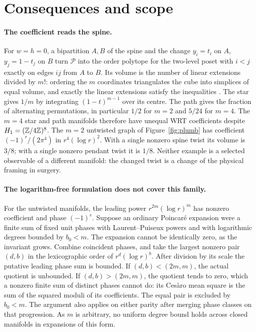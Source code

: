 \section{Consequences and scope}


\paragraph{The coefficient reads the spine.}
For \(w=h=0\), a bipartition \(A,B\) of the spine and the change \(y_i=t_i\) on \(A\), \(y_j=1-t_j\) on \(B\) turn \(\mathcal P\) into the order polytope for the two-level poset with \(i<j\) exactly on edges \(ij\) from \(A\) to \(B\). Its volume is the number of linear extensions divided by \(m!\): ordering the \(m\) coordinates triangulates the cube into simplices of equal volume, and exactly the linear extensions satisfy the inequalities \cite{Stanley}. The star gives \(1/m\) by integrating \((1-t)^{m-1}\) over its centre. The path gives the fraction of alternating permutations, in particular \(1/2\) for \(m=2\) and \(5/24\) for \(m=4\). The \(m=4\) star and path manifolds therefore have unequal WRT coefficients despite \(H_1=(\mathbb Z/4\mathbb Z)^8\). The \(m=2\) untwisted graph of Figure~\ref{fig:plumb} has coefficient \((-1)^r/(2\pi^4)\) in \(r^4(\log r)^2\). With a single nonzero spine twist its volume is \(3/8\); with a single nonzero pendant twist it is \(1/8\). Neither example is a selected observable of a different manifold: the changed twist is a change of the physical framing in surgery.

\paragraph{The logarithm-free formulation does not cover this family.}
For the untwisted manifolds, the leading power \(r^{2m}(\log r)^m\) has nonzero coefficient and phase \((-1)^r\). Suppose an ordinary Poincar\'e expansion were a finite sum of fixed unit phases with Laurent--Puiseux powers and with logarithmic degrees bounded by \(b_0<m\). The expansion cannot be identically zero, as the invariant grows. Combine coincident phases, and take the largest nonzero pair \((d,b)\) in the lexicographic order of \(r^d(\log r)^b\). After division by its scale the putative leading phase sum is bounded. If \((d,b)<(2m,m)\), the actual quotient is unbounded. If \((d,b)>(2m,m)\), the quotient tends to zero, which a nonzero finite sum of distinct phases cannot do: its Ces\`aro mean square is the sum of the squared moduli of its coefficients. The equal pair is excluded by \(b_0<m\). The argument also applies on either parity after merging phase classes on that progression. As \(m\) is arbitrary, no uniform degree bound holds across closed manifolds in expansions of this form.

